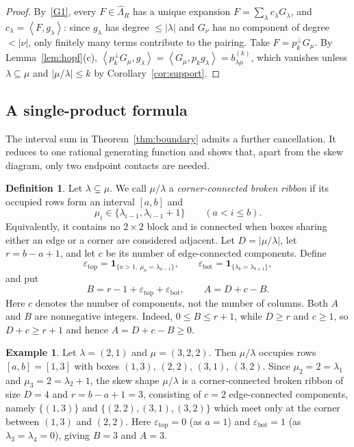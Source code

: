 \documentclass[11pt]{amsart}
\numberwithin{equation}{section}
\theoremstyle{definition}
\newtheorem{definition}[theorem]{Definition}
\newtheorem{example}[theorem]{Example}
\theoremstyle{remark}
\newcommand{\hLam}{\widehat\Lambda}
\newcommand{\Hall}[2]{\left\langle #1,#2\right\rangle}
\newcommand{\ind}{\mathbf 1}
\begin{document}
\begin{proof}
By~\ref{G1}, every $F\in\hLam_R$ has a unique expansion
$F=\sum_\lambda c_\lambda G_\lambda$, and $c_\lambda=\Hall{F}{g_\lambda}$: since
$g_\lambda$ has degree $\leq|\lambda|$ and $G_\nu$ has no component of degree
$<|\nu|$, only finitely many terms contribute to the pairing. Take
$F=p_k^\perp G_\mu$. By Lemma~\ref{lem:hopf}(c),
$\Hall{p_k^\perp G_\mu}{g_\lambda}=\Hall{G_\mu}{p_kg_\lambda}=b^{(k)}_{\lambda\mu}$,
which vanishes unless $\lambda\subseteq\mu$ and $|\mu/\lambda|\leq k$ by
Corollary~\ref{cor:support}.
\end{proof}

\subsection{A single-product formula}
\label{subsec:compact-rule}

The interval sum in Theorem~\ref{thm:boundary} admits a further
cancellation. It reduces to one rational generating function and shows
that, apart from the skew diagram, only two endpoint contacts are needed.

\begin{definition}\label{def:corner-connected}
Let $\lambda\subsetneq\mu$. We call $\mu/\lambda$ a
\emph{corner-connected broken ribbon} if its occupied rows form an
interval $[a,b]$ and
\[
 \mu_i\in\{\lambda_{i-1},\lambda_{i-1}+1\}
 \qquad(a<i\leq b).
\]
Equivalently, it contains no $2\times2$ block and is connected when
boxes sharing either an edge or a corner are considered adjacent. Let $D=|\mu/\lambda|$, let $r=b-a+1$, and let $c$ be its number of
edge-connected components. Define
\[
 \varepsilon_{\mathrm{top}}
 =\ind_{\{a>1,\ \mu_a=\lambda_{a-1}\}},\qquad
 \varepsilon_{\mathrm{bot}}
 =\ind_{\{\lambda_b=\lambda_{b+1}\}},
\]
and put
\[
 B=r-1+\varepsilon_{\mathrm{top}}+\varepsilon_{\mathrm{bot}},
 \qquad A=D+c-B.
\]
Here $c$ denotes the number of components, not the number of columns. Both $A$ and $B$ are nonnegative integers. Indeed,
$0\leq B\leq r+1$, while $D\geq r$ and $c\geq1$, so
$D+c\geq r+1$ and hence $A=D+c-B\geq0$.
\end{definition}

\begin{example}\label{ex:corner-connected}
Let $\lambda=(2,1)$ and $\mu=(3,2,2)$. Then $\mu/\lambda$ occupies rows
$[a,b]=[1,3]$ with boxes $(1,3)$, $(2,2)$, $(3,1)$, $(3,2)$. Since
$\mu_2=2=\lambda_1$ and $\mu_3=2=\lambda_2+1$, the skew shape $\mu/\lambda$ is
a corner-connected broken ribbon of size $D=4$ and $r=b-a+1=3$, consisting of
$c=2$ edge-connected components, namely $\{(1,3)\}$ and
$\{(2,2),(3,1),(3,2)\}$ which meet only at the corner between $(1,3)$ and
$(2,2)$. Here $\varepsilon_{\mathrm{top}}=0$ (as $a=1$) and
$\varepsilon_{\mathrm{bot}}=1$ (as $\lambda_3=\lambda_4=0$), giving $B=3$ and
$A=3$.
\end{example}
\end{document}
